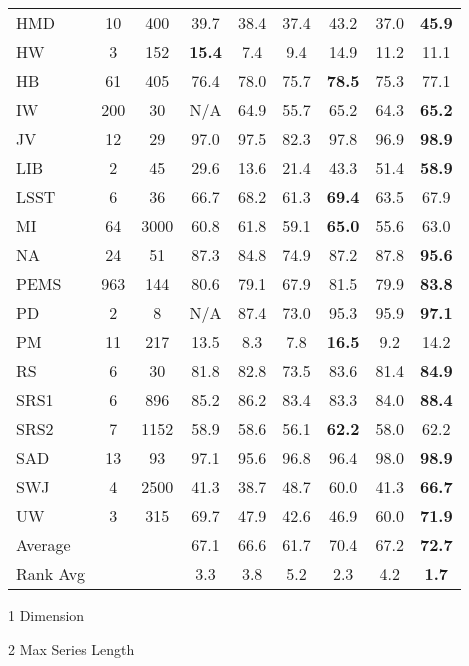 \documentclass[journal]{IEEEtran}
\begin{document}
\begin{table}[!t]
\begin{threeparttable}
\begin{tabular}{l|c|c|c|c|c|c|c|c}
HMD & 10 & 400 & 39.7 & 38.4 & 37.4 & 43.2 & 37.0 & \textbf{45.9} \\
HW & 3 & 152 & \textbf{15.4} & 7.4 & 9.4 & 14.9 & 11.2 & 11.1 \\
HB & 61 & 405 & 76.4 & 78.0 & 75.7 & \textbf{78.5} & 75.3 & 77.1 \\
IW & 200 & 30 & N/A & 64.9 & 55.7 & 65.2 & 64.3 & \textbf{65.2} \\
JV & 12 & 29 & 97.0 & 97.5 & 82.3 & 97.8 & 96.9 & \textbf{98.9} \\
LIB & 2 & 45 & 29.6 & 13.6 & 21.4 & 43.3 & 51.4 & \textbf{58.9} \\
LSST & 6 & 36 & 66.7 & 68.2 & 61.3 & \textbf{69.4} & 63.5 & 67.9 \\
MI & 64 & 3000 & 60.8 & 61.8 & 59.1 & \textbf{65.0} & 55.6 & 63.0 \\
NA & 24 & 51 & 87.3 & 84.8 & 74.9 & 87.2 & 87.8 & \textbf{95.6} \\
PEMS & 963 & 144 & 80.6 & 79.1 & 67.9 & 81.5 & 79.9 & \textbf{83.8} \\
PD & 2 & 8 & N/A & 87.4 & 73.0 & 95.3 & 95.9 & \textbf{97.1} \\
PM & 11 & 217 & 13.5 & 8.3 & 7.8 & \textbf{16.5} & 9.2 & 14.2 \\
RS & 6 & 30 & 81.8 & 82.8 & 73.5 & 83.6 & 81.4 & \textbf{84.9} \\
SRS1 & 6 & 896 & 85.2 & 86.2 & 83.4 & 83.3 & 84.0 & \textbf{88.4} \\
SRS2 & 7 & 1152 & 58.9 & 58.6 & 56.1 & \textbf{62.2} & 58.0 & 62.2 \\
SAD & 13 & 93 & 97.1 & 95.6 & 96.8 & 96.4 & 98.0 & \textbf{98.9} \\
SWJ & 4 & 2500 & 41.3 & 38.7 & 48.7 & 60.0 & 41.3 & \textbf{66.7} \\
UW & 3 & 315 & 69.7 & 47.9 & 42.6 & 46.9 & 60.0 & \textbf{71.9} \\
\midrule
Average &   &   & 67.1 & 66.6 & 61.7 & 70.4 & 67.2 & \textbf{72.7} \\
\midrule
Rank Avg &   &   & 3.3 & 3.8 & 5.2 & 2.3 & 4.2 & \textbf{1.7} \\
\bottomrule
\end{tabular}


\begin{tablenotes}
\item[1] Dimension \item[2] Max Series Length
\end{tablenotes}
\end{threeparttable}


\end{table}
\end{document}
